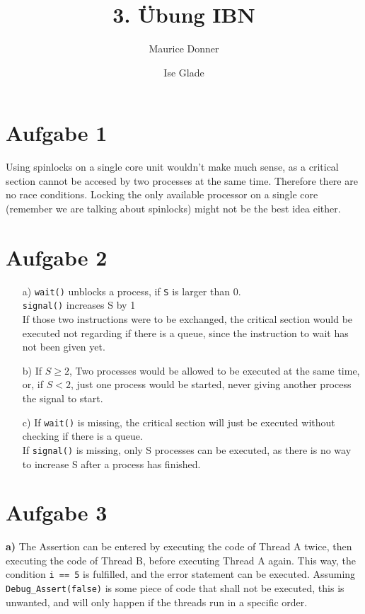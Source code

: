 \documentclass{article}
\title{\textsf{\color{blue!40!black}3. Übung IBN}}
\author{Maurice Donner \and Ise Glade}
\begin{document}
\maketitle
\newpage

\section*{Aufgabe 1}
Using spinlocks on a single core unit wouldn't make much sense, as a
critical section cannot be accesed by two processes at the same time.
Therefore there are no race conditions. Locking the only available
processor on a single core (remember we are talking about
spinlocks) might not be the best idea either.
\section*{Aufgabe 2}
\begin{itemize}
    \item[a)] 
	\verb=wait()= unblocks a process, if \verb=S= is larger than 0.\\
	\verb=signal()= increases S by 1\\
	If those two instructions were to be exchanged, the critical section
	would be executed not regarding if there is a queue, since
	the instruction to wait has not been given yet.
    \item[b)]
	If \( S \geq 2 \), Two processes would be allowed to be executed
	at the same time, or, if \( S < 2 \), just one process would
	be started, never giving another process the signal to start.
    \item[c)]
	If \verb=wait()= is missing, the critical section will just be executed
	without checking if there is a queue.\\
	If \verb=signal()= is missing, only S processes can be executed, as
	there is no way to increase S after a process has finished.
\end{itemize}
\section*{Aufgabe 3}
\textbf{a)} The Assertion can be entered by executing the code of Thread A
twice, then executing the code of Thread B, before executing Thread A again.
This way, the condition \texttt{i == 5} is fulfilled, and the error
statement can be executed. Assuming \texttt{Debug\_Assert(false)} is some
piece of code that shall not be executed, this is unwanted, and will only
happen if the threads run in a specific order.\\
\end{document}
